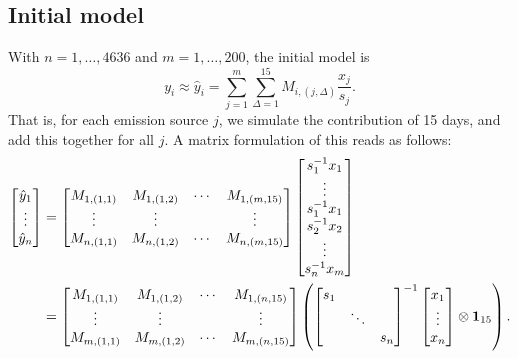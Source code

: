 \documentclass{article}
\begin{document}
\subsection{Initial model}
With $n=1,\dots,4636$ and $m = 1,\dots,200$, the initial model is
$$
y_i \approx
\hat{y}_i = \sum_{j=1}^m \sum_{\Delta = 1}^{15}  M_{i,(j,\Delta)} \frac{x_{j}}{s_j}
.$$
That is, for each emission source $j$, we simulate the contribution of 15 days, and add this together for all $j$. A matrix formulation of this reads as follows:
\begin{align}
    \label{eq: initial model concise} 
\begin{bmatrix}
    \hat{y}_1 \\ 
    \vdots \\
    \hat{y}_{n}
\end{bmatrix}
&=
\begin{bmatrix}
    M_{1,(1,1)} & M_{1,(1,2)} & \cdots & M_{1,(m,15)} \\
    \vdots & \vdots & & \vdots \\
    M_{n,(1,1)} & M_{n,(1,2)} & \cdots & M_{n,(m,15)} \\
\end{bmatrix}
\begin{bmatrix}
    s_1^{-1} x_1\\
    \vdots \\
    s_1^{-1} x_1 \\
    s_2^{-1} x_2 \\
    \vdots \\
    s_n^{-1} x_m
\end{bmatrix} 
\\
&=
\begin{bmatrix}
    M_{1,(1,1)} & M_{1,(1,2)} & \cdots & M_{1,(n,15)} \\
    \vdots & \vdots & & \vdots \\
    M_{m,(1,1)} & M_{m,(1,2)} & \cdots & M_{m,(n,15)} \\
\end{bmatrix}
\left( 
     \begin{bmatrix}
        s_1 & & \\
         & \ddots & \\
        & & s_n
     \end{bmatrix}^{-1}
     \begin{bmatrix}
        x_1 \\
        \vdots \\
        x_n
     \end{bmatrix}
     \otimes \vb{1}_{15}
\right)
\nonumber
.\end{align}
\end{document}
